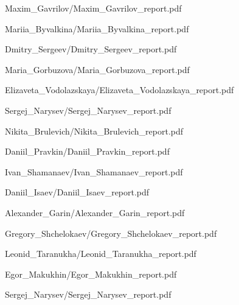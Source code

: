 \documentclass[a4paper]{article}
\begin{document}
{Maxim_Gavrilov/Maxim_Gavrilov_report.pdf}

{Mariia_Byvalkina/Mariia_Byvalkina_report.pdf}

{Dmitry_Sergeev/Dmitry_Sergeev_report.pdf}

{Maria_Gorbuzova/Maria_Gorbuzova_report.pdf}

{Elizaveta_Vodolazskaya/Elizaveta_Vodolazskaya_report.pdf}

{Sergej_Narysev/Sergej_Narysev_report.pdf}

{Nikita_Brulevich/Nikita_Brulevich_report.pdf}

{Daniil_Pravkin/Daniil_Pravkin_report.pdf}

{Ivan_Shamanaev/Ivan_Shamanaev_report.pdf}

{Daniil_Isaev/Daniil_Isaev_report.pdf}

{Alexander_Garin/Alexander_Garin_report.pdf}

{Gregory_Shchelokaev/Gregory_Shchelokaev_report.pdf}

{Leonid_Taranukha/Leonid_Taranukha_report.pdf}

{Egor_Makukhin/Egor_Makukhin_report.pdf}

{Sergej_Narysev/Sergej_Narysev_report.pdf}
\end{document}
